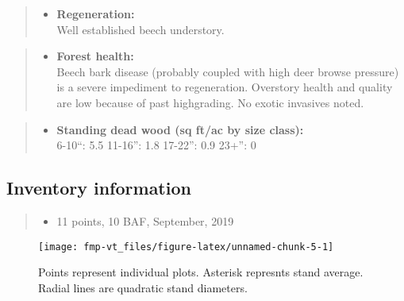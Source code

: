 \documentclass[]{tufte-handout}
\providecommand{\tightlist}{%
  \setlength{\itemsep}{0pt}\setlength{\parskip}{0pt}}
\begin{document}
\begin{quote}
\begin{itemize}
\tightlist
\item
  \textbf{Regeneration:}\\
  \vspace{2pt} Well established beech understory.
\end{itemize}
\end{quote}

\begin{quote}
\begin{itemize}
\tightlist
\item
  \textbf{Forest health:}\\
  \vspace{2pt} Beech bark disease (probably coupled with high deer
  browse pressure) is a severe impediment to regeneration. Overstory
  health and quality are low because of past highgrading. No exotic
  invasives noted.
\end{itemize}
\end{quote}

\begin{quote}
\begin{itemize}
\tightlist
\item
  \textbf{Standing dead wood (sq ft/ac by size class):}\\
  \vspace{2pt} \indent \small 6-10``: 5.5 \textbar{} 11-16'': 1.8
  \textbar{} 17-22'': 0.9 \textbar{} 23+'': 0
\end{itemize}
\end{quote}

\subsection{Inventory information}\label{inventory-information}

\begin{quote}
\begin{itemize}
\tightlist
\item
  11 points, 10 BAF, September, 2019
\end{itemize}
\end{quote}

\begin{figure}
\texttt{[image: fmp-vt\_files/figure-latex/unnamed-chunk-5-1]} \caption[Points represent individual plots]{Points represent individual plots. Asterisk represnts stand average. Radial lines are quadratic stand diameters.}\label{fig:unnamed-chunk-5}
\end{figure}
\end{document}
